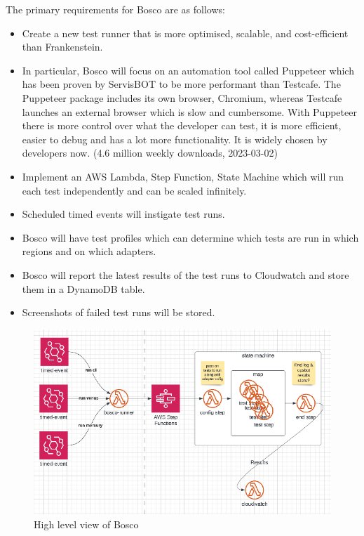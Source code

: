 \documentclass[12pt,a4paper,titlepage]{report}
\begin{document}
The primary requirements for Bosco are as follows:
\begin{itemize}
  \item Create a new test runner that is more optimised, scalable, and cost-efficient than Frankenstein. 
  \item In particular, Bosco will focus on an automation tool called Puppeteer which has been proven by ServisBOT to be more performant than Testcafe. The Puppeteer package includes its own browser, Chromium, whereas Testcafe launches an external browser which is slow and cumbersome. With Puppeteer there is more control over what the developer can test, it is more efficient, easier to debug and has a lot more functionality. It is widely chosen by developers now. (4.6 million weekly downloads, 2023-03-02) \cite{Puppeteer}
  \item Implement an AWS Lambda, Step Function, State Machine which will run each test independently and can be scaled infinitely.
  \item Scheduled timed events will instigate test runs.
  \item Bosco will have test profiles which can determine which tests are run in which regions and on which adapters. 
  \item Bosco will report the latest results of the test runs to Cloudwatch and store them in a DynamoDB table.
  \item Screenshots of failed test runs will be stored. 
\end{itemize}

\begin{figure}[ht]
 \centering
 \includegraphics[width=\textwidth,height=\textheight,keepaspectratio]{./diagrams/bosco_high_level.png}
 \caption{High level view of Bosco}
\end{figure}
\end{document}
